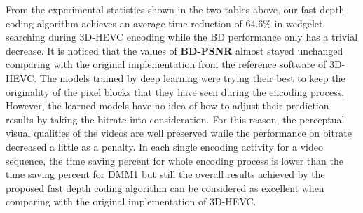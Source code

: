 From the experimental statistics shown in the two tables above,
our fast depth coding algorithm achieves
an average time reduction of 64.6\% in wedgelet searching 
during 3D-HEVC encoding
while the BD performance only has a trivial decrease.
It is noticed that the values of \textbf{BD-PSNR} almost stayed
unchanged comparing
with the original implementation from the reference software
of 3D-HEVC\@.
The models trained by deep learning
were trying their best to keep the originality of the
pixel blocks that they have seen during the encoding process.
However, the learned models have no idea of how to
adjust their prediction results by taking the bitrate
into consideration.
For this reason, the perceptual visual qualities of the videos
are well preserved while the performance on bitrate
decreased a little as 
a penalty.
In each single encoding activity for a video sequence, 
the time saving percent for whole encoding process is lower than 
the time saving percent for DMM1 but still the overall results
achieved by the proposed fast depth coding algorithm
can be considered as excellent when
comparing with the original implementation of 3D-HEVC\@.
